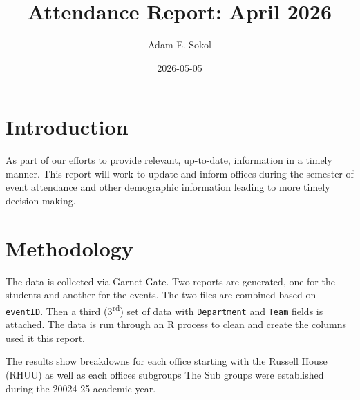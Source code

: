 \documentclass[
  letterpaper,
  DIV=11,
  numbers=noendperiod]{scrartcl}
\title{Attendance Report: April 2026}
\author{Adam E. Sokol}
\date{2026-05-05}
\begin{document}
\maketitle


\pagestyle{plain}



\newpage

\section{Introduction}\label{introduction}

\noindent As part of our efforts to provide relevant, up-to-date,
information in a timely manner. This report will work to update and
inform offices during the semester of event attendance and other
demographic information leading to more timely decision-making.

\section{Methodology}\label{methodology}

\noindent The data is collected via Garnet Gate. Two reports are
generated, one for the students and another for the events. The two
files are combined based on \texttt{eventID}. Then a third
(3\textsuperscript{rd}) set of data with \texttt{Department} and
\texttt{Team} fields is attached. The data is run through an R process
to clean and create the columns used it this report.

The results show breakdowns for each office starting with the Russell
House (RHUU) as well as each offices subgroups The Sub groups were
established during the 20024-25 academic year.
\end{document}

